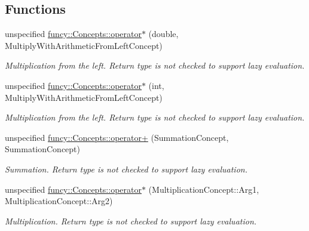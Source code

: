 \subsection*{Functions}
\begin{DoxyCompactItemize}
\item 
unspecified \hyperlink{group__ConceptGroup_ga499e3c82ec16cb79ca3ef4e4dfcbbfb5}{funcy\-::\-Concepts\-::operator$\ast$} (double, Multiply\-With\-Arithmetic\-From\-Left\-Concept)
\begin{DoxyCompactList}\small\item\em Multiplication from the left. Return type is not checked to support lazy evaluation. \end{DoxyCompactList}\item 
unspecified \hyperlink{group__ConceptGroup_ga33a9db638e532658e3b0ce78e2b8a8d4}{funcy\-::\-Concepts\-::operator$\ast$} (int, Multiply\-With\-Arithmetic\-From\-Left\-Concept)
\begin{DoxyCompactList}\small\item\em Multiplication from the left. Return type is not checked to support lazy evaluation. \end{DoxyCompactList}\item 
unspecified \hyperlink{group__ConceptGroup_ga13e0cc4a3b1f8a7f286fc017458c4364}{funcy\-::\-Concepts\-::operator+} (Summation\-Concept, Summation\-Concept)
\begin{DoxyCompactList}\small\item\em Summation. Return type is not checked to support lazy evaluation. \end{DoxyCompactList}\item 
unspecified \hyperlink{group__ConceptGroup_ga38d0d06854345ffc7ce9b41a1132e11c}{funcy\-::\-Concepts\-::operator$\ast$} (Multiplication\-Concept\-::\-Arg1, Multiplication\-Concept\-::\-Arg2)
\begin{DoxyCompactList}\small\item\em Multiplication. Return type is not checked to support lazy evaluation. \end{DoxyCompactList}\end{DoxyCompactItemize}
